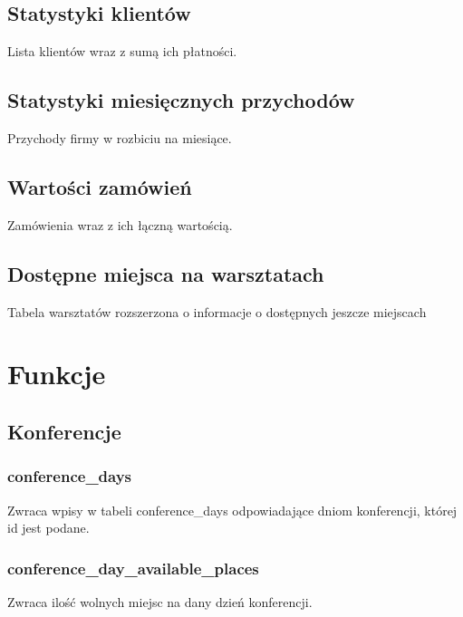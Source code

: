 \documentclass[12pt]{article}
\begin{document}
\subsection{Statystyki klientów}
Lista klientów wraz z sumą ich płatności.


\subsection{Statystyki miesięcznych przychodów}
Przychody firmy w rozbiciu na miesiące.


\subsection{Wartości zamówień}
Zamówienia wraz z ich łączną wartością.


\subsection{Dostępne miejsca na warsztatach}
Tabela warsztatów rozszerzona o informacje o dostępnych jeszcze miejscach


\section{Funkcje}
\subsection{Konferencje}
%

\subsubsection{conference\_days}
Zwraca wpisy w tabeli conference\_days odpowiadające dniom konferencji, której id jest podane.


\subsubsection{conference\_day\_available\_places}
Zwraca ilość wolnych miejsc na dany dzień konferencji.

\end{document}
